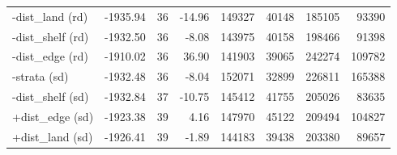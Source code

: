 \documentclass{svjour3}
\begin{document}
\begin{table}[htbp]
\begin{tabular}{lrrrrrrr}
  -dist\_land (rd) & -1935.94 & 36 & -14.96 & 149327 & 40148 & 185105 & 93390 \\
  -dist\_shelf (rd) & -1932.50 & 36 & -8.08 & 143975 & 40158 & 198466 & 91398 \\
  -dist\_edge (rd) & -1910.02 & 36 & 36.90 & 141903 & 39065 & 242274 & 109782 \\
  -strata (sd) & -1932.48 & 36 & -8.04 & 152071 & 32899 & 226811 & 165388 \\
  -dist\_shelf (sd) & -1932.84 & 37 & -10.75 & 145412 & 41755 & 205026 & 83635 \\
  +dist\_edge (sd) & -1923.38 & 39 & 4.16 & 147970 & 45122 & 209494 & 104827 \\
  +dist\_land (sd) & -1926.41 & 39 & -1.89 & 144183 & 39438 & 203380 & 89657 \\
   \hline
\end{tabular}
\label{tab:sens2013wBS}
\end{table}
\end{document}
